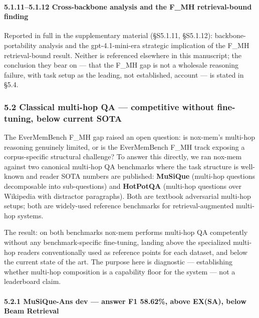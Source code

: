 \documentclass[
]{article}
\begin{document}
\paragraph{5.1.11--5.1.12 Cross-backbone analysis and the F\_MH
retrieval-bound
finding}\label{cross-backbone-analysis-and-the-f_mh-retrieval-bound-finding}

Reported in full in the supplementary material (§S5.1.11, §S5.1.12):
backbone-portability analysis and the gpt-4.1-mini-era strategic
implication of the F\_MH retrieval-bound result. Neither is referenced
elsewhere in this manuscript; the conclusion they bear on --- that the
F\_MH gap is not a wholesale reasoning failure, with task setup as the
leading, not established, account --- is stated in §5.4.

\subsubsection{5.2 Classical multi-hop QA --- competitive without
fine-tuning, below current
SOTA}\label{classical-multi-hop-qa-competitive-without-fine-tuning-below-current-sota}

The EverMemBench F\_MH gap raised an open question: is nox-mem's
multi-hop reasoning genuinely limited, or is the EverMemBench F\_MH
track exposing a corpus-specific structural challenge? To answer this
directly, we ran nox-mem against two canonical multi-hop QA benchmarks
where the task structure is well-known and reader SOTA numbers are
published: \textbf{MuSiQue} (multi-hop questions decomposable into
sub-questions) and \textbf{HotPotQA} (multi-hop questions over Wikipedia
with distractor paragraphs). Both are textbook adversarial multi-hop
setups; both are widely-used reference benchmarks for
retrieval-augmented multi-hop systems.

The result: on both benchmarks nox-mem performs multi-hop QA competently
without any benchmark-specific fine-tuning, landing above the
specialized multi-hop readers conventionally used as reference points
for each dataset, and below the current state of the art. The purpose
here is diagnostic --- establishing whether multi-hop composition is a
capability floor for the system --- not a leaderboard claim.

\paragraph{5.2.1 MuSiQue-Ans dev --- answer F1 58.62\%, above EX(SA),
below Beam
Retrieval}\label{musique-ans-dev-answer-f1-58.62-above-exsa-below-beam-retrieval}
\end{document}
